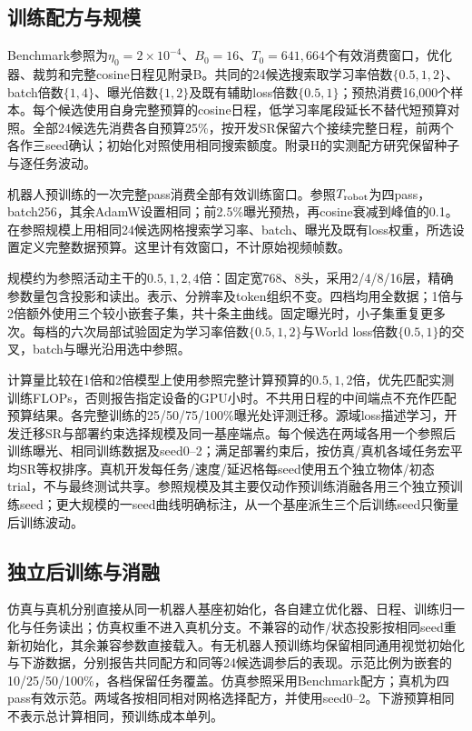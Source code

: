 \subsection{训练配方与规模}
Benchmark参照为$\eta_0=2\times10^{-4}$、$B_0=16$、$T_0=641,664$个有效消费窗口，优化器、裁剪和完整cosine日程见附录B。共同的24候选搜索取学习率倍数$\{0.5,1,2\}$、batch倍数$\{1,4\}$、曝光倍数$\{1,2\}$及既有辅助loss倍数$\{0.5,1\}$；预热消费16,000个样本。每个候选使用自身完整预算的cosine日程，低学习率尾段延长不替代短预算对照。全部24候选先消费各自预算25\%，按开发SR保留六个接续完整日程，前两个各作三seed确认；初始化对照使用相同搜索额度。附录H的实测配方研究保留种子与逐任务波动。

机器人预训练的一次完整pass消费全部有效训练窗口。参照$T_{\rm robot}$为四pass，batch256，其余AdamW设置相同；前2.5\%曝光预热，再cosine衰减到峰值的0.1。在参照规模上用相同24候选网格搜索学习率、batch、曝光及既有loss权重，所选设置定义完整数据预算。这里计有效窗口，不计原始视频帧数。

规模约为参照活动主干的$0.5,1,2,4$倍：固定宽768、8头，采用2/4/8/16层，精确参数量包含投影和读出。表示、分辨率及token组织不变。四档均用全数据；1倍与2倍额外使用三个较小嵌套子集，共十条主曲线。固定曝光时，小子集重复更多次。每档的六次局部试验固定为学习率倍数$\{0.5,1,2\}$与World loss倍数$\{0.5,1\}$的交叉，batch与曝光沿用选中参照。

计算量比较在1倍和2倍模型上使用参照完整计算预算的$0.5,1,2$倍，优先匹配实测训练FLOPs，否则报告指定设备的GPU小时。不共用日程的中间端点不充作匹配预算结果。各完整训练的25/50/75/100\%曝光处评测迁移。源域loss描述学习，开发迁移SR与部署约束选择规模及同一基座端点。每个候选在两域各用一个参照后训练曝光、相同训练数据及seed0--2；满足部署约束后，按仿真/真机各域任务宏平均SR等权排序。真机开发每任务/速度/延迟格每seed使用五个独立物体/初态trial，不与最终测试共享。参照规模及其主要仅动作预训练消融各用三个独立预训练seed；更大规模的一seed曲线明确标注，从一个基座派生三个后训练seed只衡量后训练波动。



\subsection{独立后训练与消融}
仿真与真机分别直接从同一机器人基座初始化，各自建立优化器、日程、训练归一化与任务读出；仿真权重不进入真机分支。不兼容的动作/状态投影按相同seed重新初始化，其余兼容参数直接载入。有无机器人预训练均保留相同通用视觉初始化与下游数据，分别报告共同配方和同等24候选调参后的表现。示范比例为嵌套的10/25/50/100\%，各档保留任务覆盖。仿真参照采用Benchmark配方；真机为四pass有效示范。两域各按相同相对网格选择配方，并使用seed0--2。下游预算相同不表示总计算相同，预训练成本单列。

